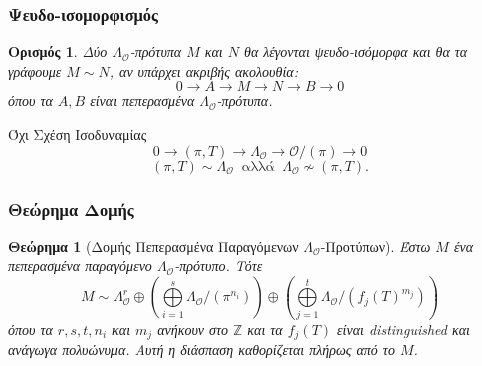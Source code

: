 \documentclass{beamer}
\newcommand {\tl}{\textlatin}
\newcommand{\Z}{\mathbb{Z}}
\newcommand{\Lo}{\Lambda_{\mathcal{O}}}
\newtheorem{thrm}{Θεώρημα}
\newtheorem*{defn}{Ορισμός}
\begin{document}
\begin{frame}
\frametitle{Ψευδο-ισομορφισμός}
\begin{defn}
    Δύο $\Lo$-πρότυπα $M$ και $N$ θα λέγονται ψευδο-ισόμορφα και θα τα γράφουμε $M\sim N$, αν υπάρχει ακριβής ακολουθία:
    $$0 \longrightarrow A \longrightarrow M \longrightarrow N \longrightarrow B \longrightarrow 0$$ όπου τα $A,B$ είναι πεπερασμένα $\Lo$-πρότυπα.
\end{defn}
\pause
\begin{block}{Όχι Σχέση Ισοδυναμίας}
$$0 \longrightarrow (\pi,T) \longrightarrow \Lo \longrightarrow \mathcal{O}/(\pi)\longrightarrow 0$$ 
$$(\pi,T) \sim \Lo \ \text{ αλλά } \ \Lo \nsim (\pi,T).$$
\end{block}
\end{frame}


\begin{frame}
\frametitle{Θεώρημα Δομής}

\begin{thrm}[Δομής Πεπερασμένα Παραγόμενων $\Lo$-Προτύπων]
    Έστω $M$ ένα πεπερασμένα παραγόμενο $\Lo$-πρότυπο. Τότε
    $$M \sim \Lo^r \oplus \left(\bigoplus\limits_{i=1}^s \Lo/(\pi^{n_i})\right) \oplus \left( \bigoplus\limits_{j=1}^t \Lo/(f_j(T)^{m_j})\right)$$ όπου τα $r,s,t,n_i$ και $m_j$ ανήκουν στο $\Z$ και τα $f_j(T)$ είναι \tl{distinguished} και ανάγωγα πολυώνυμα. Αυτή η διάσπαση καθορίζεται πλήρως από το $M$.
\end{thrm}
\end{frame}



\end{document}
